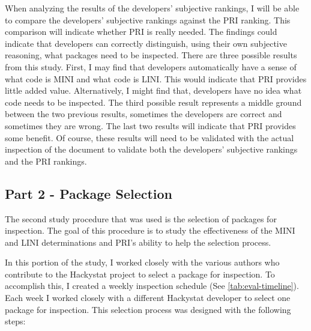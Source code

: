 When analyzing the results of the developers' subjective rankings, I will
be able to compare the developers' subjective rankings against the PRI
ranking.  This comparison will indicate whether PRI is really needed. The
findings could indicate that developers can correctly distinguish, using
their own subjective reasoning, what packages need to be inspected. There
are three possible results from this study. First, I may find that
developers automatically have a sense of what code is MINI and what code is
LINI. This would indicate that PRI provides little added value.
Alternatively, I might find that, developers have no idea what code needs
to be inspected. The third possible result represents a middle ground
between the two previous results, sometimes the developers are correct and
sometimes they are wrong. The last two results will indicate that PRI
provides some benefit. Of course, these results will need to be validated
with the actual inspection of the document to validate both the developers'
subjective rankings and the PRI rankings.



\subsection{Part 2 - Package Selection}
\label{subsection:package-selection}
The second study procedure that was used is the selection of packages for
inspection. The goal of this procedure is to study the effectiveness of the
MINI and LINI determinations and PRI's ability to help the selection
process.

In this portion of the study, I worked closely with the various authors who
contribute to the Hackystat project to select a package for inspection. To
accomplish this, I created a weekly inspection schedule (See
\ref{tab:eval-timeline}). Each week I worked closely with a different
Hackystat developer to select one package for inspection. This selection
process was designed with the following steps:


